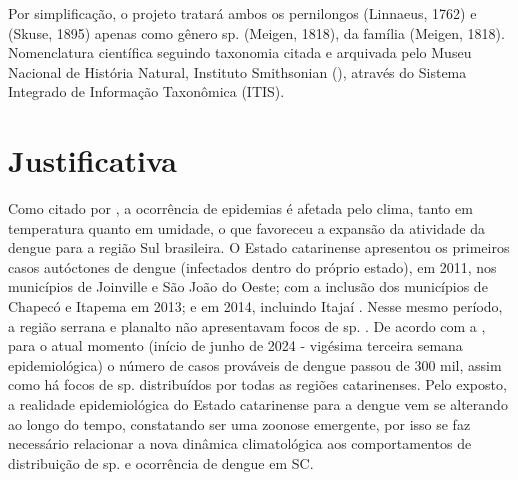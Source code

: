 \indent Por simplificação, o projeto tratará ambos os pernilongos  (Linnaeus, 1762) e  (Skuse, 1895) apenas como gênero  sp. (Meigen, 1818), da família  (Meigen, 1818). Nomenclatura científica seguindo taxonomia citada e arquivada pelo Museu Nacional de História Natural, Instituto Smithsonian (\citeyear{ITIS}), através do Sistema Integrado de Informação Taxonômica (\acrfull{ITIS}).



\newpage
\section{Justificativa}
\indent Como citado por , a ocorrência de epidemias é afetada pelo clima, tanto em temperatura quanto em umidade, o que favoreceu a expansão da atividade da dengue para a região Sul brasileira. O Estado catarinense apresentou os primeiros casos autóctones de dengue (infectados dentro do próprio estado), em 2011, nos municípios de Joinville e São João do Oeste; com a inclusão dos municípios de Chapecó e Itapema em 2013; e em 2014, incluindo Itajaí \cite{OTPCampo}. Nesse mesmo período, a região serrana e planalto não apresentavam focos de  sp. \cite{Matiola2020Dissertação}. De acordo com a , para o atual momento (início de junho de 2024 - vigésima terceira semana epidemiológica) o número de casos prováveis de dengue passou de 300 mil, assim como há focos de  sp. distribuídos por todas as regiões catarinenses. Pelo exposto, a realidade epidemiológica do Estado catarinense para a dengue vem se alterando ao longo do tempo, constatando ser uma zoonose emergente, por isso se faz necessário relacionar a nova dinâmica climatológica aos comportamentos de distribuição de  sp. e ocorrência de dengue em \acrlong{SC}.


 
